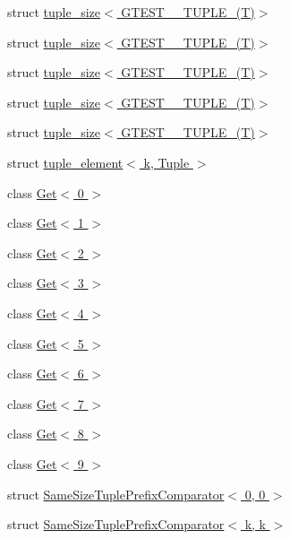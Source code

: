 \begin{DoxyCompactItemize}
\item 
struct \hyperlink{structstd_1_1tr1_1_1tuple__size_3_01GTEST__6__TUPLE___07T_08_4}{tuple\-\_\-size$<$ G\-T\-E\-S\-T\-\_\-\_\-\-T\-U\-P\-L\-E\-\_\-(\-T)$>$}
\item 
struct \hyperlink{structstd_1_1tr1_1_1tuple__size_3_01GTEST__7__TUPLE___07T_08_4}{tuple\-\_\-size$<$ G\-T\-E\-S\-T\-\_\-\_\-\-T\-U\-P\-L\-E\-\_\-(\-T)$>$}
\item 
struct \hyperlink{structstd_1_1tr1_1_1tuple__size_3_01GTEST__8__TUPLE___07T_08_4}{tuple\-\_\-size$<$ G\-T\-E\-S\-T\-\_\-\_\-\-T\-U\-P\-L\-E\-\_\-(\-T)$>$}
\item 
struct \hyperlink{structstd_1_1tr1_1_1tuple__size_3_01GTEST__9__TUPLE___07T_08_4}{tuple\-\_\-size$<$ G\-T\-E\-S\-T\-\_\-\_\-\-T\-U\-P\-L\-E\-\_\-(\-T)$>$}
\item 
struct \hyperlink{structstd_1_1tr1_1_1tuple__size_3_01GTEST__10__TUPLE___07T_08_4}{tuple\-\_\-size$<$ G\-T\-E\-S\-T\-\_\-\_\-\-T\-U\-P\-L\-E\-\_\-(\-T)$>$}
\item 
struct \hyperlink{structstd_1_1tr1_1_1tuple__element}{tuple\-\_\-element$<$ k, Tuple $>$}
\item 
class \hyperlink{classstd_1_1tr1_1_1gtest__internal_1_1Get_3_010_01_4}{\-Get$<$ 0 $>$}
\item 
class \hyperlink{classstd_1_1tr1_1_1gtest__internal_1_1Get_3_011_01_4}{\-Get$<$ 1 $>$}
\item 
class \hyperlink{classstd_1_1tr1_1_1gtest__internal_1_1Get_3_012_01_4}{\-Get$<$ 2 $>$}
\item 
class \hyperlink{classstd_1_1tr1_1_1gtest__internal_1_1Get_3_013_01_4}{\-Get$<$ 3 $>$}
\item 
class \hyperlink{classstd_1_1tr1_1_1gtest__internal_1_1Get_3_014_01_4}{\-Get$<$ 4 $>$}
\item 
class \hyperlink{classstd_1_1tr1_1_1gtest__internal_1_1Get_3_015_01_4}{\-Get$<$ 5 $>$}
\item 
class \hyperlink{classstd_1_1tr1_1_1gtest__internal_1_1Get_3_016_01_4}{\-Get$<$ 6 $>$}
\item 
class \hyperlink{classstd_1_1tr1_1_1gtest__internal_1_1Get_3_017_01_4}{\-Get$<$ 7 $>$}
\item 
class \hyperlink{classstd_1_1tr1_1_1gtest__internal_1_1Get_3_018_01_4}{\-Get$<$ 8 $>$}
\item 
class \hyperlink{classstd_1_1tr1_1_1gtest__internal_1_1Get_3_019_01_4}{\-Get$<$ 9 $>$}
\item 
struct \hyperlink{structstd_1_1tr1_1_1gtest__internal_1_1SameSizeTuplePrefixComparator_3_010_00_010_01_4}{\-Same\-Size\-Tuple\-Prefix\-Comparator$<$ 0, 0 $>$}
\item 
struct \hyperlink{structstd_1_1tr1_1_1gtest__internal_1_1SameSizeTuplePrefixComparator_3_01k_00_01k_01_4}{\-Same\-Size\-Tuple\-Prefix\-Comparator$<$ k, k $>$}
\end{DoxyCompactItemize}
